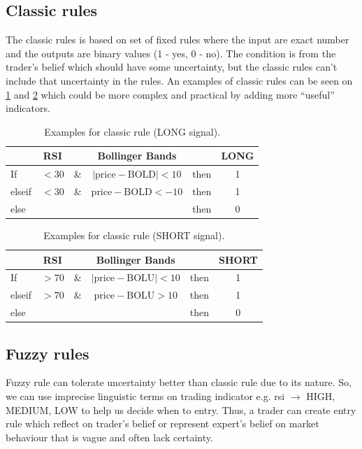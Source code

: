 \documentclass{article}
\begin{document}
\subsection*{Classic rules}
The classic rules is based on set of fixed rules where the input are exact number and the outputs are binary values (1 - yes, 0 - no). 
The condition is from the trader's belief which should have some uncertainty, but the classic rules can't include that uncertainty in the rules.
An examples of classic rules can be seen on \cref*{table:1} and \cref*{table:2} which could be more complex and practical by adding more ``useful'' indicators.
\begin{table}[htp]
	\centering
	\begin{tabular}{l c c c c c}
		\toprule
        {} & {RSI} & {} & {Bollinger Bands} & {} & {LONG} \\ 
        \midrule
        If & $<30$ & \& & $|\text{price} - \text{BOLD}| < 10$ & then & 1 \\
        elseif & $<30$ & \& & $\text{price} - \text{BOLD} < -10$ & then & 1 \\
        else &  &  &  & then & 0 \\
        \bottomrule
    \end{tabular} 
    \caption{Examples for classic rule (LONG signal).}
	\label{table:1}
\end{table}
\begin{table}[htp]
	\centering
	\begin{tabular}{l c c c c c}
		\toprule
        {} & {RSI} & {} & {Bollinger Bands} & {} & {SHORT} \\ 
        \midrule
        If & $ >70$ & \& & $|\text{price} - \text{BOLU}| < 10$ & then & 1 \\
        elseif & $ >70$ & \& & $\text{price} - \text{BOLU} > 10$ & then & 1 \\
        else &  &  &  & then & 0 \\
        \bottomrule
    \end{tabular} 
    \caption{Examples for classic rule (SHORT signal).}
	\label{table:2}
\end{table}

\subsection*{Fuzzy rules}
Fuzzy rule can tolerate uncertainty better than classic rule due to its nature. So, we can use imprecise linguistic terms on 
trading indicator e.g. rsi $\rightarrow$ HIGH, MEDIUM, LOW to help us decide when to entry. Thus, a trader can create entry rule 
which reflect on trader's belief or represent expert's belief on market behaviour that is vague and often lack certainty.
\end{document}
